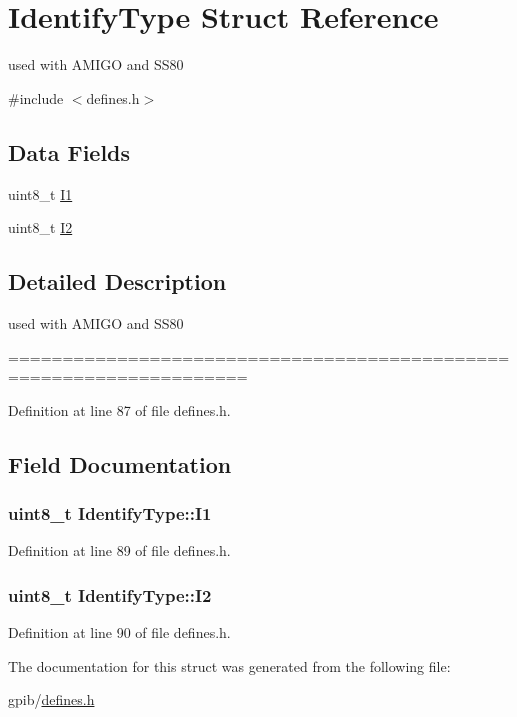 \hypertarget{structIdentifyType}{}\section{Identify\+Type Struct Reference}
\label{structIdentifyType}


used with A\+M\+I\+GO and S\+S80  




{\ttfamily \#include $<$defines.\+h$>$}

\subsection*{Data Fields}
\begin{DoxyCompactItemize}
\item 
uint8\+\_\+t \hyperlink{structIdentifyType_a8a504de4df6ede470dc1d541b62c7ec8}{I1}
\item 
uint8\+\_\+t \hyperlink{structIdentifyType_a7cb0551ebecaa249b8f5d5df24e156af}{I2}
\end{DoxyCompactItemize}


\subsection{Detailed Description}
used with A\+M\+I\+GO and S\+S80 

==================================================================== 

Definition at line 87 of file defines.\+h.



\subsection{Field Documentation}
\subsubsection[{\texorpdfstring{I1}{I1}}]{\setlength{\rightskip}{0pt plus 5cm}uint8\+\_\+t Identify\+Type\+::\+I1}\hypertarget{structIdentifyType_a8a504de4df6ede470dc1d541b62c7ec8}{}\label{structIdentifyType_a8a504de4df6ede470dc1d541b62c7ec8}


Definition at line 89 of file defines.\+h.

\subsubsection[{\texorpdfstring{I2}{I2}}]{\setlength{\rightskip}{0pt plus 5cm}uint8\+\_\+t Identify\+Type\+::\+I2}\hypertarget{structIdentifyType_a7cb0551ebecaa249b8f5d5df24e156af}{}\label{structIdentifyType_a7cb0551ebecaa249b8f5d5df24e156af}


Definition at line 90 of file defines.\+h.



The documentation for this struct was generated from the following file\+:\begin{DoxyCompactItemize}
\item 
gpib/\hyperlink{defines_8h}{defines.\+h}\end{DoxyCompactItemize}
